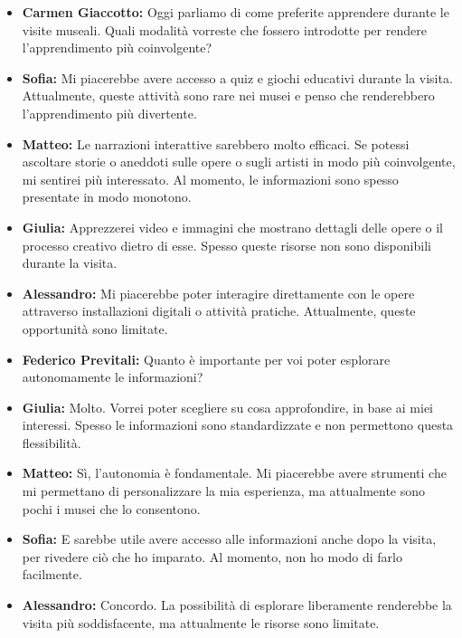 \documentclass{article}
\begin{document}
\begin{itemize}

 \item \textbf{Carmen Giaccotto:} Oggi parliamo di come preferite apprendere durante le visite museali. Quali modalità vorreste che fossero introdotte per rendere l’apprendimento più coinvolgente?
 
 \item \textbf{Sofia:} Mi piacerebbe avere accesso a quiz e giochi educativi durante la visita. Attualmente, queste attività sono rare nei musei e penso che renderebbero l’apprendimento più divertente.
 
 \item \textbf{Matteo:} Le narrazioni interattive sarebbero molto efficaci. Se potessi ascoltare storie o aneddoti sulle opere o sugli artisti in modo più coinvolgente, mi sentirei più interessato. Al momento, le informazioni sono spesso presentate in modo monotono.
 
 \item \textbf{Giulia:} Apprezzerei video e immagini che mostrano dettagli delle opere o il processo creativo dietro di esse. Spesso queste risorse non sono disponibili durante la visita.
 
 \item \textbf{Alessandro:} Mi piacerebbe poter interagire direttamente con le opere attraverso installazioni digitali o attività pratiche. Attualmente, queste opportunità sono limitate.
 
 \item \textbf{Federico Previtali:} Quanto è importante per voi poter esplorare autonomamente le informazioni?
 
 \item \textbf{Giulia:} Molto. Vorrei poter scegliere su cosa approfondire, in base ai miei interessi. Spesso le informazioni sono standardizzate e non permettono questa flessibilità.
 
 \item \textbf{Matteo:} Sì, l’autonomia è fondamentale. Mi piacerebbe avere strumenti che mi permettano di personalizzare la mia esperienza, ma attualmente sono pochi i musei che lo consentono.
 
 \item \textbf{Sofia:} E sarebbe utile avere accesso alle informazioni anche dopo la visita, per rivedere ciò che ho imparato. Al momento, non ho modo di farlo facilmente.
 
 \item \textbf{Alessandro:} Concordo. La possibilità di esplorare liberamente renderebbe la visita più soddisfacente, ma attualmente le risorse sono limitate.
 

\end{itemize}
\end{document}
